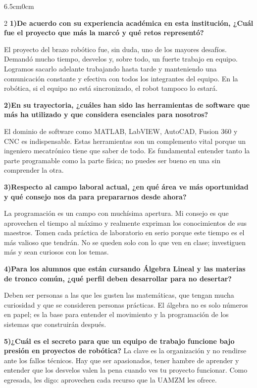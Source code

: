 \documentclass[10pt,twoside]{article}
\begin{document}
\begin{adjustwidth}{6.5cm}{0cm}
\begin{multicols}{2}
\textbf{1)De acuerdo con su experiencia académica en esta institución, ¿Cuál fue el proyecto que más la marcó y qué retos representó?}

El proyecto del brazo robótico fue, sin duda, uno de los mayores desafíos. Demandó mucho tiempo, desvelos y, sobre todo, un fuerte trabajo en equipo. Logramos sacarlo adelante trabajando hasta tarde y manteniendo una comunicación constante y efectiva con todos los integrantes del equipo. En la robótica, si el equipo no está sincronizado, el robot tampoco lo estará.

\textbf{2)En su trayectoria, ¿cuáles han sido las herramientas de software que más ha utilizado y que considera esenciales para nosotros?}

El dominio de software como MATLAB, LabVIEW, AutoCAD, Fusion 360 y CNC es indispensable. Estas herramientas son un complemento vital porque un ingeniero mecatrónico tiene que saber de todo. Es fundamental entender tanto la parte programable como la parte física; no puedes ser bueno en una sin comprender la otra.

\textbf{3)Respecto al campo laboral actual, ¿en qué área ve más oportunidad y qué consejo nos da para prepararnos desde ahora?}

La programación es un campo con muchísima apertura. Mi consejo es que aprovechen el tiempo al máximo y realmente expriman los conocimientos de sus maestros. Tomen cada práctica de laboratorio en serio porque este tiempo es el más valioso que tendrán. No se queden solo con lo que ven en clase; investiguen más y sean curiosos con los temas.

\textbf{4)Para los alumnos que están cursando Álgebra Lineal y las materias de tronco común, ¿qué perfil deben desarrollar para no desertar?}

Deben ser personas a las que les gusten las matemáticas, que tengan mucha curiosidad y que se consideren personas prácticas. El álgebra no es solo números en papel; es la base para entender el movimiento y la programación de los sistemas que construirán después.

\textbf{5)¿Cuál es el secreto para que un equipo de trabajo funcione bajo presión en proyectos de robótica?}
La clave es la organización y no rendirse ante los fallos técnicos. Hay que ser apasionados, tener hambre de aprender y entender que los desvelos valen la pena cuando ves tu proyecto funcionar. Como egresada, les digo: aprovechen cada recurso que la UAMZM les ofrece.


\end{multicols}



\end{adjustwidth}
\end{document}
